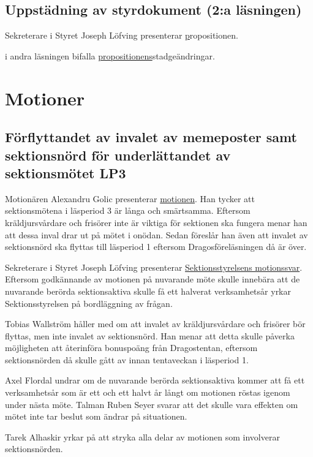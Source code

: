 \documentclass[hidelinks]{sektionsmote}
\begin{document}
\subsection{Uppstädning av styrdokument (2:a läsningen)}
Sekreterare i Styret Joseph Löfving presenterar \hyperlink{bilagor/prop/a.pdf.1}propositionen.

\begin{beslut}
  \item i andra läsningen bifalla \hyperlink{bilagor/prop/a.pdf.1}{propositionens}stadgeändringar.
\end{beslut}

\section{Motioner}

\subsection{Förflyttandet av invalet av memeposter samt sektionsnörd för underlättandet av sektionsmötet LP3}
Motionären Alexandru Golic presenterar \hyperlink{bilagor/motion/a.pdf.1}{motionen}.
Han tycker att sektionsmötena i läsperiod 3 är långa och smärtsamma.
Eftersom kräldjursvårdare och frisörer inte är viktiga för sektionen ska fungera menar han att dessa inval drar ut på mötet i onödan.
Sedan föreslår han även att invalet av sektionsnörd ska flyttas till läsperiod 1 eftersom Dragosföreläsningen då är över.

Sekreterare i Styret Joseph Löfving presenterar \hyperlink{bilagor/motion/asvar.pdf.1}{Sektionsstyrelsens motionssvar}.
Eftersom godkännande av motionen på nuvarande möte skulle innebära att de nuvarande berörda sektionsaktiva skulle få ett halverat verksamhetsår yrkar Sektionsstyrelsen på bordläggning av frågan.

Tobias Wallström håller med om att invalet av kräldjursvårdare och frisörer bör flyttas, men inte invalet av sektionsnörd.
Han menar att detta skulle påverka möjligheten att återinföra bonuspoäng från Dragostentan, eftersom sektionsnörden då skulle gått av innan tentaveckan i läsperiod 1.

Axel Flordal undrar om de nuvarande berörda sektionsaktiva kommer att få ett verksamhetsår som är ett och ett halvt år långt om motionen röstas igenom under nästa möte.
Talman Ruben Seyer svarar att det skulle vara effekten om mötet inte tar beslut som ändrar på situationen.

Tarek Alhaskir yrkar på att stryka alla delar av motionen som involverar sektionsnörden.
\end{document}
